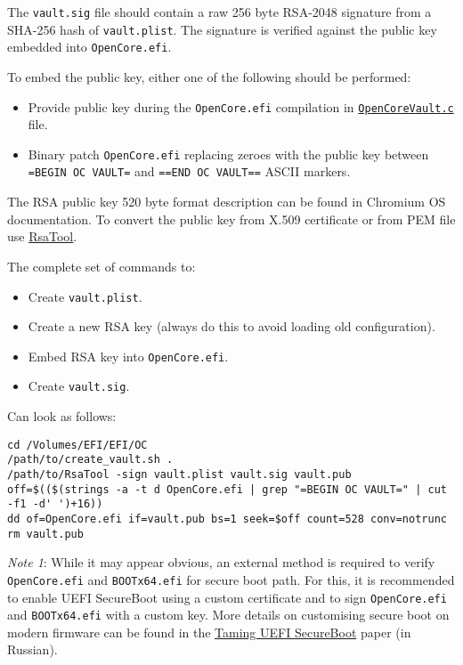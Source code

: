 \documentclass[]{article}
\providecommand{\tightlist}{%
  \setlength{\itemsep}{0pt}\setlength{\parskip}{0pt}}
\begin{document}
\begin{enumerate}
  The \texttt{vault.sig} file should contain a raw 256 byte RSA-2048 signature from a SHA-256
  hash of \texttt{vault.plist}. The signature is verified against the public key embedded
  into \texttt{OpenCore.efi}.

  To embed the public key, either one of the following should be performed:

  \begin{itemize}
  \tightlist
  \item Provide public key during the \texttt{OpenCore.efi} compilation in
  \href{https://github.com/acidanthera/OpenCorePkg/blob/master/Platform/OpenCore/OpenCoreVault.c}{\texttt{OpenCoreVault.c}} file.
  \item Binary patch \texttt{OpenCore.efi} replacing zeroes with the public key
  between \texttt{=BEGIN OC VAULT=} and \texttt{==END OC VAULT==} ASCII markers.
  \end{itemize}

  The RSA public key 520 byte format description can be found in Chromium OS documentation.
  To convert the public key from X.509 certificate or from PEM file use
  \href{https://github.com/acidanthera/OpenCorePkg/tree/master/Utilities/CreateVault}{RsaTool}.


  The complete set of commands to:

  \begin{itemize}
  \tightlist
  \item Create \texttt{vault.plist}.
  \item Create a new RSA key (always do this to avoid loading old configuration).
  \item Embed RSA key into \texttt{OpenCore.efi}.
  \item Create \texttt{vault.sig}.
  \end{itemize}

  Can look as follows:
\begin{lstlisting}[label=createvault, style=ocbash]
cd /Volumes/EFI/EFI/OC
/path/to/create_vault.sh .
/path/to/RsaTool -sign vault.plist vault.sig vault.pub
off=$(($(strings -a -t d OpenCore.efi | grep "=BEGIN OC VAULT=" | cut -f1 -d' ')+16))
dd of=OpenCore.efi if=vault.pub bs=1 seek=$off count=528 conv=notrunc
rm vault.pub
\end{lstlisting}

  \emph{Note 1}: While it may appear obvious, an external
  method is required to verify \texttt{OpenCore.efi} and \texttt{BOOTx64.efi} for
  secure boot path. For this, it is recommended to enable UEFI SecureBoot
  using a custom certificate and to sign \texttt{OpenCore.efi} and \texttt{BOOTx64.efi}
  with a custom key. More details on customising secure boot on modern firmware
  can be found in the \href{https://habr.com/post/273497/}{Taming UEFI SecureBoot}
  paper (in Russian).


\end{enumerate}
\end{document}
